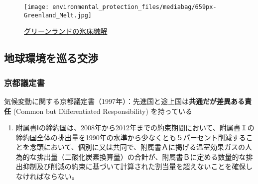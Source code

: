 \documentclass[
  xelatex,
  ja=standard]{bxjsarticle}
\providecommand{\tightlist}{%
  \setlength{\itemsep}{0pt}\setlength{\parskip}{0pt}}\usepackage{longtable,booktabs,array}
\begin{document}
\begin{figure}[htpb]

{\centering \texttt{[image: environmental\_protection\_files/mediabag/659px-Greenland\_Melt.jpg]}

}

\caption{\href{https://commons.wikimedia.org/wiki/File:Greenland_Meltdown_08072012_12072012.jpg}{グリーンランドの氷床融解}}

\end{figure}

\hypertarget{ux5730ux7403ux74b0ux5883ux3092ux5de1ux308bux4ea4ux6e09}{%
\subsection{地球環境を巡る交渉}\label{ux5730ux7403ux74b0ux5883ux3092ux5de1ux308bux4ea4ux6e09}}

\hypertarget{ux4eacux90fdux8b70ux5b9aux66f8}{%
\subsubsection{京都議定書}\label{ux4eacux90fdux8b70ux5b9aux66f8}}

気候変動に関する京都議定書（1997年）：先進国と途上国は\textbf{共通だが差異ある責任}
(Common but Differentiated Responsibility) を持っている

\begin{tcolorbox}[enhanced jigsaw, title=\textcolor{quarto-callout-note-color}{\faInfo}\hspace{0.5em}{\href{https://www.mofa.go.jp/mofaj/gaiko/treaty/treaty_020413.html}{気候変動に関する国際連合枠組条約の京都議定書}　第3条}, bottomtitle=1mm, rightrule=.15mm, breakable, arc=.35mm, leftrule=.75mm, opacityback=0, colbacktitle=quarto-callout-note-color!10!white, left=2mm, coltitle=black, toptitle=1mm, titlerule=0mm, colback=white, bottomrule=.15mm, toprule=.15mm, colframe=quarto-callout-note-color-frame, opacitybacktitle=0.6]

\begin{enumerate}
\def\labelenumi{\arabic{enumi}.}
\tightlist
\item
  附属書Ⅰの締約国は、2008年から2012年までの約束期間において、附属書Ｉの締約国全体の排出量を1990年の水準から少なくとも５パーセント削減することを念頭において、個別に又は共同で、附属書Ａに掲げる温室効果ガスの人為的な排出量（二酸化炭素換算量）の合計が、附属書Ｂに定める数量的な排出抑制及び削減の約束に基づいて計算された割当量を超えないことを確保しなければならない。
\end{enumerate}

\end{tcolorbox}
\end{document}
